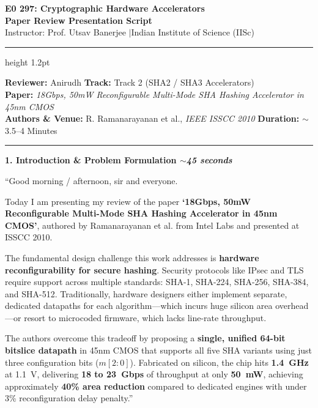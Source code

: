 \documentclass[11pt,a4paper]{article}
\begin{document}
\begin{center}
    {\Large\bfseries\color{iiscblue} E0 297: Cryptographic Hardware Accelerators}\\[3pt]
    {\large\bfseries Paper Review Presentation Script}\\[3pt]
    {\normalsize Instructor: Prof. Utsav Banerjee \quad$\vert$\quad Indian Institute of Science (IISc)}\\[5pt]
    \hrule height 1.2pt
\end{center}

\vspace{0.2em}
\noindent\textbf{Reviewer:} Anirudh \hfill \textbf{Track:} Track 2 (SHA2 / SHA3 Accelerators) \\
\textbf{Paper:} \textit{18Gbps, 50mW Reconfigurable Multi-Mode SHA Hashing Accelerator in 45nm CMOS} \\
\textbf{Authors \& Venue:} R. Ramanarayanan et al., \textit{IEEE ISSCC 2010} \hfill \textbf{Duration:} $\sim$3.5--4 Minutes

\vspace{0.5em}
\hrule
\vspace{0.5em}

{\large\bfseries\color{iiscblue} 1. Introduction \& Problem Formulation \hfill \normalfont\small\itshape $\sim$45 seconds}

\vspace{0.2em}
``Good morning / afternoon, sir and everyone.

Today I am presenting my review of the paper \textbf{`18Gbps, 50mW Reconfigurable Multi-Mode SHA Hashing Accelerator in 45nm CMOS'}, authored by Ramanarayanan et al. from Intel Labs and presented at ISSCC 2010.

The fundamental design challenge this work addresses is \textbf{hardware reconfigurability for secure hashing}. Security protocols like IPsec and TLS require support across multiple standards: SHA-1, SHA-224, SHA-256, SHA-384, and SHA-512. Traditionally, hardware designers either implement separate, dedicated datapaths for each algorithm---which incurs huge silicon area overhead---or resort to microcoded firmware, which lacks line-rate throughput.

The authors overcome this tradeoff by proposing a \textbf{single, unified 64-bit bitslice datapath} in 45nm CMOS that supports all five SHA variants using just three configuration bits ($m[2:0]$). Fabricated on silicon, the chip hits \textbf{1.4~GHz} at 1.1~V, delivering \textbf{18 to 23~Gbps} of throughput at only \textbf{50~mW}, achieving approximately \textbf{40\% area reduction} compared to dedicated engines with under 3\% reconfiguration delay penalty.''
\end{document}
